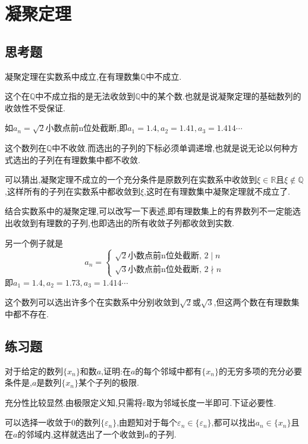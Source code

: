 \section{凝聚定理}
 \subsection{思考题}
     \begin{example}
         凝聚定理在实数系中成立,在有理数集$\mathbb{Q} $中不成立.
     \end{example}
     \begin{solution}
         这个在$\mathbb{Q}$中不成立指的是无法收敛到$\mathbb{Q}$中的某个数.也就是说凝聚定理的基础数列的收敛性不受保证.

         如$a_n=\sqrt{2}$小数点前n位处截断,即$a_1=1.4,a_2=1.41,a_3=1.414\cdots$

         这个数列在$\mathbb{Q}$中不收敛.而选出的子列的下标必须单调递增,也就是说无论以何种方式选出的子列在有理数集中都不收敛.

         可以猜出,凝聚定理不成立的一个充分条件是原数列在实数系中收敛到$\xi\in\mathbb{R}$且$\xi\notin\mathbb{Q}$,这样所有的子列在实数系中都收敛到$\xi$,这时在有理数集中凝聚定理就不成立了.

         结合实数系中的凝聚定理,可以改写一下表述,即有理数集上的有界数列不一定能选出收敛到有理数的子列,也即选出的所有收敛子列都收敛到实数.

         另一个例子就是
         \[
             a_n=
             \begin{cases}
                 \sqrt{2}\text{小数点前n位处截断},\, 2\mid  n \\
                 \sqrt{3}\text{小数点前n位处截断},\, 2\nmid n
             \end{cases}
         \]
         即$a_1=1.4,a_2=1.73,a_3=1.414\cdots$

         这个数列可以选出许多个在实数系中分别收敛到$\sqrt{2}$或$\sqrt{3}$,但这两个数在有理数集中都不存在.
     \end{solution}
 \subsection{练习题}
     \begin{exercise}
         对于给定的数列$\{x_n\}$和数$a$,证明:在$a$的每个邻域中都有$\{x_n\}$的无穷多项的充分必要条件是,$a$是数列$\{x_n\}$某个子列的极限.
     \end{exercise}
     \begin{solution}
         充分性比较显然.由极限定义知,只需将$\varepsilon$取为邻域长度一半即可.下证必要性.

         可以选择一收敛于0的数列$\{\varepsilon_n\}$,由题知对于每个$\varepsilon_n\in\{\varepsilon_n\}$,都可以找出$a_n\in\{x_n\}$且在$a$的邻域内,这样就选出了一个收敛到$a$的子列.
     \end{solution}

